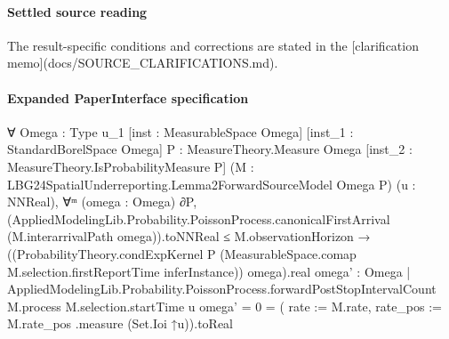 \documentclass[10pt]{article}
\begin{document}
\paragraph{Settled source reading}
\begin{sloppypar}
The result-\allowbreak{}specific conditions and corrections are stated in the [clarification memo](docs/\allowbreak{}SOURCE\_\allowbreak{}CLARIFICATIONS.\allowbreak{}md).\allowbreak{}
\end{sloppypar}

\paragraph{Expanded PaperInterface specification}
\begin{ReviewVerbatim}
∀ {Omega : Type u_1} [inst : MeasurableSpace Omega] [inst_1 : StandardBorelSpace Omega]
  {P : MeasureTheory.Measure Omega} [inst_2 : MeasureTheory.IsProbabilityMeasure P]
  (M : LBG24SpatialUnderreporting.Lemma2ForwardSourceModel Omega P) (u : NNReal),
  ∀ᵐ (omega : Omega) ∂P,
    (AppliedModelingLib.Probability.PoissonProcess.canonicalFirstArrival (M.interarrivalPath omega)).toNNReal ≤
        M.observationHorizon →
      ((ProbabilityTheory.condExpKernel P (MeasurableSpace.comap M.selection.firstReportTime inferInstance)) omega).real
          {omega' : Omega |
            AppliedModelingLib.Probability.PoissonProcess.forwardPostStopIntervalCount M.process M.selection.startTime u
                omega' =
              0} =
        ({ rate := M.rate, rate_pos := M.rate_pos }.measure (Set.Ioi ↑u)).toReal
\end{ReviewVerbatim}
\end{document}
